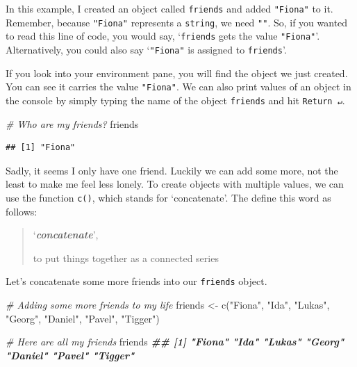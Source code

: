 \documentclass[
]{book}
\newenvironment{Shaded}{\begin{snugshade}}{\end{snugshade}}
\newcommand{\CommentTok}[1]{\textcolor[rgb]{0.56,0.35,0.01}{\textit{#1}}}
\newcommand{\DocumentationTok}[1]{\textcolor[rgb]{0.56,0.35,0.01}{\textbf{\textit{#1}}}}
\newcommand{\FunctionTok}[1]{\textcolor[rgb]{0.00,0.00,0.00}{#1}}
\newcommand{\NormalTok}[1]{#1}
\newcommand{\OtherTok}[1]{\textcolor[rgb]{0.56,0.35,0.01}{#1}}
\newcommand{\StringTok}[1]{\textcolor[rgb]{0.31,0.60,0.02}{#1}}
\begin{document}
In this example, I created an object called \texttt{friends} and added \texttt{"Fiona"} to it. Remember, because \texttt{"Fiona"} represents a \texttt{string}, we need \texttt{""}. So, if you wanted to read this line of code, you would say, `\texttt{friends} gets the value \texttt{"Fiona"}'. Alternatively, you could also say `\texttt{"Fiona"} is assigned to \texttt{friends}'.

If you look into your environment pane, you will find the object we just created. You can see it carries the value \texttt{"Fiona"}. We can also print values of an object in the console by simply typing the name of the object \texttt{friends} and hit \texttt{Return\ ↵}.

\begin{Shaded}
\begin{Highlighting}[]
\CommentTok{\# Who are my friends?}
\NormalTok{friends}
\end{Highlighting}
\end{Shaded}

\begin{verbatim}
## [1] "Fiona"
\end{verbatim}

Sadly, it seems I only have one friend. Luckily we can add some more, not the least to make me feel less lonely. To create objects with multiple values, we can use the function \texttt{c()}, which stands for `concatenate'. The \citet{concatenate-2021} define this word as follows:

\begin{quote}
`\textbf{\emph{concatenate}}',

to put things together as a connected series
\end{quote}

Let's concatenate some more friends into our \texttt{friends} object.

\begin{Shaded}
\begin{Highlighting}[]
\CommentTok{\# Adding some more friends to my life}
\NormalTok{friends }\OtherTok{\textless{}{-}} \FunctionTok{c}\NormalTok{(}\StringTok{"Fiona"}\NormalTok{, }\StringTok{"Ida"}\NormalTok{, }\StringTok{"Lukas"}\NormalTok{, }\StringTok{"Georg"}\NormalTok{, }\StringTok{"Daniel"}\NormalTok{, }\StringTok{"Pavel"}\NormalTok{, }\StringTok{"Tigger"}\NormalTok{)}

\CommentTok{\# Here are all my friends}
\NormalTok{friends}
\DocumentationTok{\#\# [1] "Fiona"  "Ida"    "Lukas"  "Georg"  "Daniel" "Pavel"  "Tigger"}
\end{Highlighting}
\end{Shaded}
\end{document}
